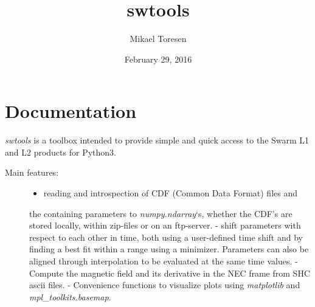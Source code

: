 \documentclass[letterpaper,10pt,english]{sphinxhowto}
\title{swtools}
\date{February 29, 2016}
\author{Mikael Toresen}
\begin{document}
\maketitle
\tableofcontents
{}\label{index::doc}

\label{index:index}\label{swtools_doc:swtools-doc}\label{swtools_doc:module-swtools}\label{swtools_doc:swtools-doc}

\section{Documentation}
\label{swtools_doc:swtools-index}\label{swtools_doc::doc}\label{swtools_doc:documentation}
\emph{swtools} is a toolbox intended to provide simple and quick access to
the Swarm L1 and L2 products for Python3.
\begin{description}
\item[{Main features:}] \leavevmode\begin{itemize}
\item {} 
reading and introspection of CDF (Common Data Format) files and

\end{itemize}

the containing parameters to \emph{numpy.ndarray}`s, whether the CDF's
are stored locally, within zip-files or on an ftp-server.
- shift parameters with respect to each other in time, both using a
user-defined time shift and by finding a best fit within a range
using a minimizer. Parameters can also be aligned through
interpolation to be evaluated at the same time values.
- Compute the magnetic field and its derivative in the NEC frame
from SHC ascii files.
- Convenience functions to visualize plots using \emph{matplotlib} and
\emph{mpl\_toolkits.basemap}.

\end{description}
\end{document}
